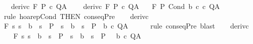 \begin{isabellebody}
\ \ \ deriv{\isacharunderscore}c{}{\isacharcolon}\ {\isachardoublequoteopen}{\isasymGamma}{\isacharcomma}{\isasymTheta}{\isasymturnstile}\isactrlbsub {\isacharslash}F\isactrlesub \ P\ c\ Q{\isacharcomma}A{\isachardoublequoteclose}\ \isanewline
\ \ \ deriv{\isacharunderscore}c{}{\isacharcolon}\ {\isachardoublequoteopen}{\isasymGamma}{\isacharcomma}{\isasymTheta}{\isasymturnstile}\isactrlbsub {\isacharslash}F\isactrlesub \ P\ c\ Q{\isacharcomma}A{\isachardoublequoteclose}\isanewline
\ \ \ {\isachardoublequoteopen}{\isasymGamma}{\isacharcomma}{\isasymTheta}{\isasymturnstile}\isactrlbsub {\isacharslash}F\isactrlesub \ P\ {\isacharparenleft}Cond\ b\ c\ c\ Q{\isacharcomma}A{\isachardoublequoteclose}\isanewline
%
\isadelimproof
%
\endisadelimproof
%
\isatagproof
{}\isamarkupfalse%
\ {\isacharparenleft}rule\ hoarep{\isachardot}Cond\ {\isacharbrackleft}THEN\ conseqPre{\isacharbrackright}{\isacharparenright}\isanewline
\ \ \isamarkupfalse%
\ deriv{\isacharunderscore}c{}\ \isanewline
\ \ \isamarkupfalse%
\ {\isachardoublequoteopen}{\isasymGamma}{\isacharcomma}{\isasymTheta}{\isasymturnstile}\isactrlbsub {\isacharslash}F\isactrlesub \ {\isacharparenleft}{\isacharbraceleft}s{\isachardot}\ {\isacharparenleft}s\ {\isasymin}\ b\ {\isasymlongrightarrow}\ s\ {\isasymin}\ P\ {\isasymand}\ {\isacharparenleft}s\ {\isasymnotin}\ b\ {\isasymlongrightarrow}\ s\ {\isasymin}\ P\ {\isasyminter}\ b{\isacharparenright}\ c\ Q{\isacharcomma}A{\isachardoublequoteclose}\isanewline
\ \ \ \ \isamarkupfalse%
\ {\isacharparenleft}rule\ conseqPre{\isacharparenright}\ blast\isanewline
{}\isamarkupfalse%
\isanewline
\ \ \isamarkupfalse%
\ deriv{\isacharunderscore}c{}\ \isanewline
\ \ \isamarkupfalse%
\ {\isachardoublequoteopen}{\isasymGamma}{\isacharcomma}{\isasymTheta}{\isasymturnstile}\isactrlbsub {\isacharslash}F\isactrlesub \ {\isacharparenleft}{\isacharbraceleft}s{\isachardot}\ {\isacharparenleft}s\ {\isasymin}\ b\ {\isasymlongrightarrow}\ s\ {\isasymin}\ P\ {\isasymand}\ {\isacharparenleft}s\ {\isasymnotin}\ b\ {\isasymlongrightarrow}\ s\ {\isasymin}\ P\ {\isasyminter}\ {\isacharminus}\ b{\isacharparenright}\ c\ Q{\isacharcomma}A{\isachardoublequoteclose}\isanewline

\end{isabellebody}
